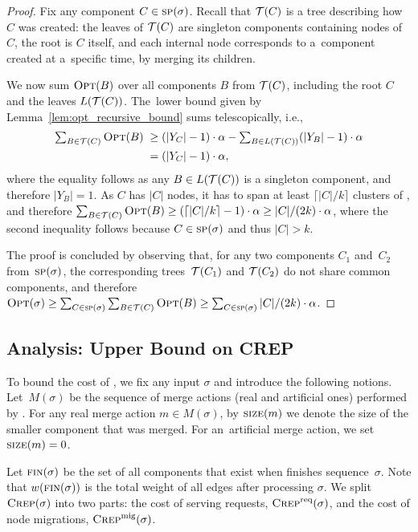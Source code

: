 \begin{proof}
Fix any component $C \in \textsc{sp}(\sigma)$. Recall that $\mathcal{T}(C)$ is a tree
describing how $C$ was created: the leaves of $\mathcal{T}(C)$ are singleton
components containing nodes of $C$, the root is $C$ itself, and each internal
node corresponds to a~component created at a~specific time, by merging its
children.

We now sum $\textsc{Opt}(B)$ over all components $B$ from $\mathcal{T}(C)$, including 
the root $C$ and the leaves $L(\mathcal{T}(C))$. The~lower bound given 
by Lemma~\ref{lem:opt_recursive_bound} sums telescopically, i.e.,
\begin{align*}
	\textstyle \sum_{B \in \mathcal{T}(C)} \textsc{Opt}(B) \;
		\geq &\; \textstyle (|Y_C|-1) \cdot \alpha - \sum_{B \in L(\mathcal{T}(C))} (|Y_B|-1) \cdot \alpha \\
		= &\; \textstyle (|Y_C|-1) \cdot \alpha,
\end{align*}
where the equality follows as any $B \in L(\mathcal{T}(C))$ is a singleton component,
and therefore $|Y_B| = 1$. As $C$ has $|C|$ nodes, it has to span at least
$\lceil |C|/k \rceil$ clusters of \OPT, and therefore $\sum_{B \in \mathcal{T}(C)}
\textsc{Opt}(B) \geq (\lceil |C|/k \rceil -1) \cdot \alpha \geq |C| / (2 k) \cdot
\alpha$, where the second inequality follows because $C \in \textsc{sp}(\sigma)$ and
thus $|C| > k$.

The proof is concluded by observing that, for any two components $C_1$
and~$C_2$ from~$\textsc{sp}(\sigma)$, the corresponding trees~$\mathcal{T}(C_1)$ and $\mathcal{T}(C_2)$ do not share common
components, and therefore $\textsc{Opt}(\sigma) \geq \sum_{C \in \textsc{sp}(\sigma)} \sum_{B
\in \mathcal{T}(C)} \textsc{Opt}(B) \geq \sum_{C \in \textsc{sp}(\sigma)} |C| / (2k) \cdot \alpha$.
\end{proof}


\subsection{Analysis: Upper Bound on CREP}
\label{sec:crep_upper}

To bound the cost of \CREP, we fix any input $\sigma$ and introduce the following 
notions. Let~$M(\sigma)$ be the sequence of merge actions 
(real and artificial ones) performed by \CREP. 
For any real merge action $m \in M(\sigma)$, by
$\textsc{size}(m)$ we denote the size of the smaller component that was
merged. For an~artificial merge action, we set $\textsc{size}(m) = 0$.

Let $\textsc{fin}(\sigma)$ be the set of all components that exist when \CREP finishes
sequence~$\sigma$. Note that $w(\textsc{fin}(\sigma))$ is the total weight of all
edges after processing $\sigma$. We split 
$\textsc{Crep}(\sigma)$ into two parts: the cost of serving requests, $\textsc{Crep}^\textnormal{req}(\sigma)$, 
and the cost of node migrations, $\textsc{Crep}^\textnormal{mig}(\sigma)$. 

